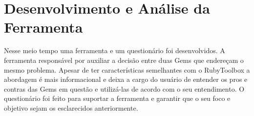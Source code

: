 \section{Desenvolvimento e Análise da Ferramenta}
Nesse meio tempo uma ferramenta e um questionário foi desenvolvidos. A ferramenta responsável por auxiliar a decisão entre duas Gems que endereçam o mesmo problema. Apesar de ter características semelhantes com o RubyToolbox a abordagem é mais informacional e deixa a cargo do usuário de entender os pros e contras das Gems em questão e utilizá-las de acordo com o seu entendimento. O questionário foi feito para suportar a ferramenta e garantir que o seu foco e objetivo sejam os esclarecidos anteriormente.